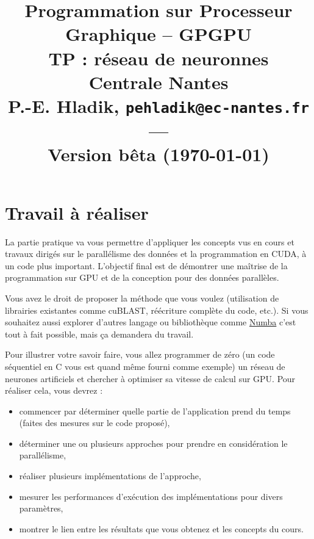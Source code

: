 \documentclass[11pt]{paper}
\title{{\Large Programmation sur Processeur Graphique -- GPGPU }\\
\vspace{-0.4em}
{\large TP : réseau de neuronnes}\\
{\small Centrale Nantes}\\
\small P.-E. Hladik, \small{\texttt{pehladik@ec-nantes.fr}}\\
---\\
{\scriptsize  Version bêta (\today)}\\
}
\begin{document}
\maketitle

  \section{Travail à réaliser}

La partie pratique va vous permettre d'appliquer les concepts vus en cours et travaux dirigés sur le parallélisme des données et la programmation en CUDA, à un code plus important. 
L'objectif final est de démontrer une maîtrise de la programmation sur GPU et de la conception pour des données parallèles.

Vous avez le droit de proposer la méthode que vous voulez (utilisation de librairies existantes comme cuBLAST, réécriture complète du code, etc.). Si vous souhaitez aussi explorer d'autres langage ou bibliothèque comme \href{https://numba.readthedocs.io/en/stable/}{Numba} c'est tout à fait possible, mais ça demandera du travail.\bigskip

Pour illustrer votre savoir faire, vous allez programmer de zéro (un code séquentiel en C vous est quand même fourni comme exemple) un réseau de neurones artificiels et chercher à optimiser sa vitesse de calcul sur GPU.
Pour réaliser cela, vous devrez :
\begin{itemize}
	\item commencer par déterminer quelle partie de l'application prend du temps (faites des mesures sur le code proposé),
	\item déterminer une ou plusieurs approches pour prendre en considération le parallélisme,
	\item réaliser plusieurs implémentations de l'approche,
	\item mesurer les performances d'exécution des implémentations pour divers paramètres,
	\item montrer le lien entre les résultats que vous obtenez et les concepts du cours.\bigskip
\end{itemize}
\end{document}
